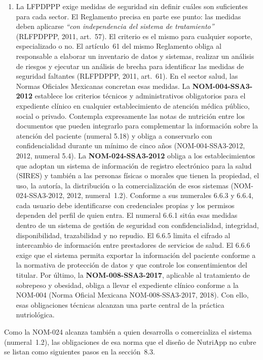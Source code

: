 \documentclass[12pt, a4paper]{article}
\begin{document}
\begin{enumerate}[label=\Roman*.]
  \item La LFPDPPP exige medidas de seguridad sin definir cuáles son
  suficientes para cada sector. El Reglamento precisa en parte ese
  punto: las medidas deben aplicarse \textit{``con independencia del
  sistema de tratamiento''} (RLFPDPPP, 2011, art.~57). El
  criterio es el mismo para cualquier soporte, especializado o no.
  El artículo~61 del mismo Reglamento obliga al responsable a
  elaborar un inventario de datos y sistemas, realizar un análisis
  de riesgos y ejecutar un análisis de brecha para identificar las
  medidas de seguridad faltantes (RLFPDPPP, 2011, art.~61). En el
  sector salud, las Normas Oficiales Mexicanas concretan esas
  medidas. La \textbf{NOM-004-SSA3-2012} establece los criterios
  técnicos y administrativos obligatorios para el expediente clínico
  en cualquier establecimiento de atención médica público, social o
  privado. Contempla expresamente las notas de nutrición entre los
  documentos que pueden integrarlo para complementar la información
  sobre la atención del paciente (numeral 5.18) y obliga a
  conservarlo con confidencialidad durante un mínimo de cinco años
  (NOM-004-SSA3-2012, 2012, numeral 5.4).
  La \textbf{NOM-024-SSA3-2012} obliga a los establecimientos que
  adoptan un sistema de información de registro electrónico para la
  salud (SIRES) y también a las personas físicas o morales que tienen
  la propiedad, el uso, la autoría, la distribución o la
  comercialización de esos sistemas (NOM-024-SSA3-2012, 2012, numeral~1.2). Conforme a sus numerales
  6.6.3 y 6.6.4, cada usuario debe identificarse con credenciales
  propias y los permisos dependen del perfil de quien entra. El numeral
  6.6.1 sitúa esas medidas dentro de un sistema de gestión de seguridad
  con confidencialidad, integridad, disponibilidad, trazabilidad y no
  repudio. El 6.6.5 limita el cifrado al intercambio de información entre
  prestadores de servicios de salud. El 6.6.6 exige que el sistema permita
  exportar la información del paciente conforme a la normativa de
  protección de datos y que controle los consentimientos del titular. Por
  último, la \textbf{NOM-008-SSA3-2017},
  aplicable al tratamiento de sobrepeso y obesidad, obliga a llevar
  el expediente clínico conforme a la NOM-004 (Norma Oficial Mexicana
  NOM-008-SSA3-2017, 2018). Con ello, esas obligaciones técnicas
  alcanzan una parte central de la práctica nutriológica.
 
\end{enumerate}
 
Como la NOM-024
alcanza también a quien desarrolla
o comercializa el sistema (numeral~1.2), las obligaciones de esa norma que el diseño de NutriApp no cubre se listan como siguientes
pasos en la sección~8.3.
 
\end{document}
